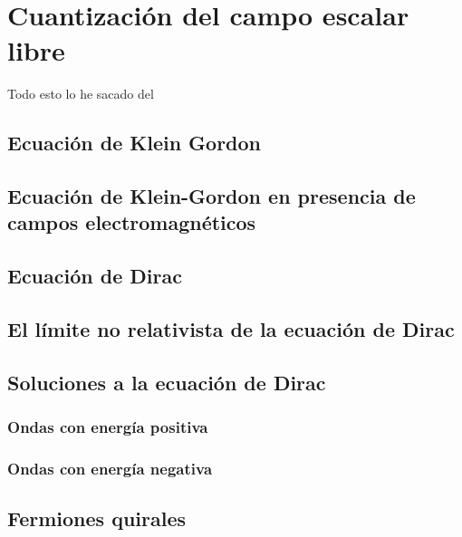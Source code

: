 \setchapterpreamble[u]{\margintoc}
\chapter{Cuantización del campo escalar libre}

\begin{center}
  \large Todo esto lo he sacado del \cite{Dobdado}
\end{center}
\section{Ecuación de Klein Gordon}
\section{Ecuación de Klein-Gordon en presencia de campos electromagnéticos}
\section{Ecuación de Dirac}
\section{El límite no relativista de la ecuación de Dirac}
\section{Soluciones a la ecuación de Dirac}
\subsection{Ondas con energía positiva}
\subsection{Ondas con energía negativa}
\section{Fermiones quirales}